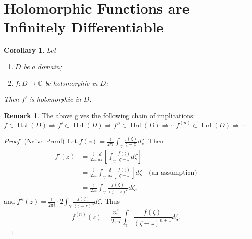 \documentclass[12pt,openany]{book}
\newtheorem{corollary}{Corollary}[theorem]
\theoremstyle{definition}
\newtheorem{remark}{Remark}[section]
\newcommand{\C}{\mathbb{C}}
\newcommand{\of}[1]{\left( #1 \right)}
\newcommand{\Hol}{\operatorname{Hol}}
\begin{document}
	\section{Holomorphic Functions are Infinitely Differentiable}
	\begin{tcolorbox}[colback=white,colframe=corcolor,arc=5pt,title={\color{white}\bf }]
		\begin{corollary}
			Let \begin{enumerate}[(1)]
				\item $D$ be a domain;
				\item $f:D\to\C$ be holomorphic in $D$;
			\end{enumerate} Then $f'$ is holomorphic in $D$.
		\end{corollary}
	\end{tcolorbox}
	\begin{remark}
		The above gives the following chain of implications: \[
		\boxed{f\in\Hol\of{D}}\Rightarrow\boxed{f'\in\Hol\of{D}}\Rightarrow\boxed{f''\in\Hol\of{D}}\Rightarrow\cdots\boxed{f^{\of{n}}\in\Hol\of{D}}\Rightarrow\cdots.
		\]
	\end{remark}
	\begin{proof}
		(Naive Proof) Let $\displaystyle f\of{z}=\frac{1}{2\pi i}\int_\gamma\frac{f\of{\zeta}}{\zeta-z}d\zeta$. Then \begin{align*}
		f'\of{z}&=\frac{1}{2\pi i}\frac{d}{dz}\left[\int_\gamma\frac{f\of{\zeta}}{\zeta-z}d\zeta\right]\\
		&=\frac{1}{2\pi i}\int_\gamma\frac{d}{dz}\left[\frac{f\of{\zeta}}{\zeta-z}\right]d\zeta\quad\text{(an assumption)}\\
		&=\frac{1}{2\pi i}\int_\gamma\frac{f\of{\zeta}}{\of{\zeta-z}^2}d\zeta,
		\end{align*} and $f''\of{z}=\displaystyle\frac{1}{2\pi i}\cdot 2\int_\gamma\frac{f\of{\zeta}}{\of{\zeta-z}^3}d\zeta$. Thus \[
		f^{\of{n}}\of{z}=\frac{n!}{2\pi i}\int_\gamma\frac{f\of{\zeta}}{\of{\zeta-z}^{n+1}}d\zeta.
		\]
	\end{proof}
	
	\newpage
\end{document}
